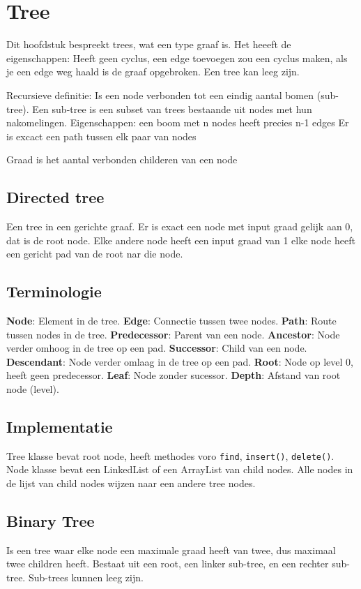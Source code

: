 \section{Tree}
Dit hoofdstuk bespreekt trees, wat een type graaf is.
Het heeeft de eigenschappen:
Heeft geen cyclus, een edge toevoegen zou een cyclus maken, als je een edge weg haald is de graaf opgebroken.
Een tree kan leeg zijn.

Recursieve definitie:
Is een node verbonden tot een eindig aantal bomen (sub-tree).
Een sub-tree is een subset van trees bestaande uit nodes met hun nakomelingen.
Eigenschappen: een boom met n nodes heeft precies n-1 edges
Er is excact een path tussen elk paar van nodes

Graad is het aantal verbonden childeren van een node

\subsection{Directed tree}
Een tree in een gerichte graaf.
Er is exact een node met input graad gelijk aan 0, dat is de root node.
Elke andere node heeft een input graad van 1
elke node heeft een gericht pad van de root nar die node.

\subsection{Terminologie}
\textbf{Node}: Element in de tree.
\textbf{Edge}: Connectie tussen twee nodes.
\textbf{Path}: Route tussen nodes in de tree.
\textbf{Predecessor}: Parent van een node.
\textbf{Ancestor}: Node verder omhoog in de tree op een pad.
\textbf{Successor}: Child van een node.
\textbf{Descendant}: Node verder omlaag in de tree op een pad.
\textbf{Root}: Node op level 0, heeft geen predecessor.
\textbf{Leaf}: Node zonder sucessor.
\textbf{Depth}: Afstand van root node (level).

\subsection{Implementatie}
Tree klasse bevat root node, heeft methodes voro \texttt{find}, \texttt{insert()}, \texttt{delete()}.
Node klasse bevat een LinkedList of een ArrayList van child nodes.
Alle nodes in de lijst van child nodes wijzen naar een andere tree nodes.

\subsection{Binary Tree}
Is een tree waar elke node een maximale graad heeft van twee, dus maximaal twee children heeft.
Bestaat uit een root, een linker sub-tree, en een rechter sub-tree.
Sub-trees kunnen leeg zijn.

